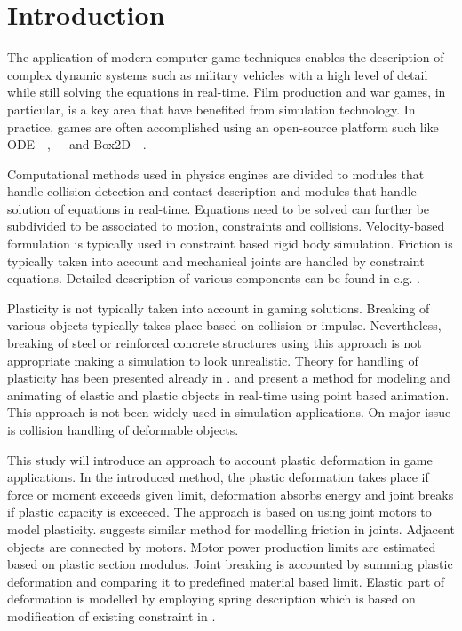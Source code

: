 \section{Introduction}

The application of modern computer game techniques enables the description of complex dynamic systems 
such as military vehicles with a high level of detail while still solving the equations in real-time.
Film production and war games, in particular, is a key area that have benefited from simulation technology. 
In practice, games are often accomplished using an open-source platform such 
like ODE - \cite{ode}, \bullet\ - \cite{bullet} and Box2D - \cite{box2d}.

Computational methods used in physics engines are divided to modules that handle collision detection and 
contact description and modules that handle solution of equations in real-time. Equations need to be 
solved can further be subdivided to be associated to motion, constraints and collisions. 
Velocity-based formulation is typically used in constraint based rigid body simulation. 
Friction is typically taken into account and mechanical joints are handled by constraint equations.
Detailed description of various components can be found in e.g. \cite{erleben.thesis}.

Plasticity is not typically taken into account in gaming solutions. 
Breaking of various objects typically takes place based on collision or impulse.
Nevertheless, breaking of steel or reinforced concrete structures using this approach 
is not appropriate making a simulation to look unrealistic. Theory for handling of plasticity 
has been presented already in \cite{cg1988}. \cite{muller2004point} and \cite{muller2005meshless} 
present a method for modeling and animating of elastic and plastic objects in real-time using 
point based animation. This approach is not been widely used in simulation applications.  
On major issue is collision handling of deformable objects.

This study will introduce an approach to account plastic deformation in game applications.   
In the introduced method, the plastic deformation takes place if force or moment exceeds given 
limit, deformation absorbs energy and joint breaks if plastic capacity is exceeced. 
The approach is based on using joint motors to model plasticity. \cite[p.~90]{erleben.thesis} 
suggests similar method for modelling friction in joints. Adjacent objects are connected by motors. 
Motor power production limits are estimated based on plastic section modulus. 
Joint breaking is accounted by summing plastic deformation and comparing it to 
predefined material based limit. Elastic part of deformation is modelled by employing 
spring description which is based on modification of existing constraint in \bullet.

